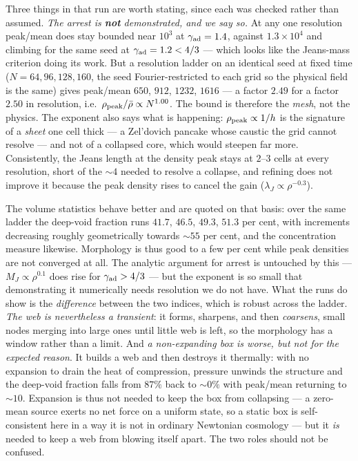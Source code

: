 \documentclass[11pt]{article}
\begin{document}
Three things in that run are worth stating, since each was checked rather than assumed. \emph{The arrest is
\textbf{not} demonstrated, and we say so.} At any one resolution peak/mean does stay bounded near $10^3$ at
$\gamma_{\rm ad}=1.4$, against $1.3\times10^4$ and climbing for the same seed at $\gamma_{\rm ad}=1.2<4/3$ --- which
looks like the Jeans-mass criterion doing its work. But a resolution ladder on an identical seed at fixed time
($N=64,96,128,160$, the seed Fourier-restricted to each grid so the physical field is the same) gives peak/mean
$650$, $912$, $1232$, $1616$ --- a factor $2.49$ for a factor $2.50$ in resolution, i.e.\
$\rho_{\rm peak}/\bar\rho\propto N^{1.00}$. The bound is therefore the \emph{mesh}, not the physics. The exponent
also says what is happening: $\rho_{\rm peak}\propto1/h$ is the signature of a \emph{sheet} one cell thick --- a
Zel'dovich pancake whose caustic the grid cannot resolve --- and not of a collapsed core, which would steepen far
more. Consistently, the Jeans length at the density peak stays at $2$--$3$ cells at every resolution, short of the
${\sim}4$ needed to resolve a collapse, and refining does not improve it because the peak density rises to cancel
the gain ($\lambda_J\propto\rho^{-0.3}$).

The volume statistics behave better and are quoted on that basis: over the same ladder the deep-void fraction runs
$41.7$, $46.5$, $49.3$, $51.3$ per cent, with increments decreasing roughly geometrically towards ${\sim}55$ per
cent, and the concentration measure likewise. Morphology is thus good to a few per cent while peak densities are
not converged at all. The analytic argument for arrest
is untouched by this --- $M_J\propto\rho^{0.1}$ does rise for $\gamma_{\rm ad}>4/3$ --- but the exponent is so small
that demonstrating it numerically needs resolution we do not have. What the runs do show is the \emph{difference}
between the two indices, which is robust across the ladder. \emph{The web is nevertheless a transient}: it forms, sharpens, and then \emph{coarsens}, small
nodes merging into large ones until little web is left, so the morphology has a window rather than a limit. And
\emph{a non-expanding box is worse, but not for the expected reason}. It builds a web and then destroys it
thermally: with no expansion to drain the heat of compression, pressure unwinds the structure and the deep-void
fraction falls from $87\%$ back to ${\sim}0\%$ with peak/mean returning to ${\sim}10$. Expansion is thus not needed
to keep the box from collapsing --- a zero-mean source exerts no net force on a uniform state, so a static box is
self-consistent here in a way it is not in ordinary Newtonian cosmology --- but it \emph{is} needed to keep a web
from blowing itself apart. The two roles should not be confused.
\end{document}
